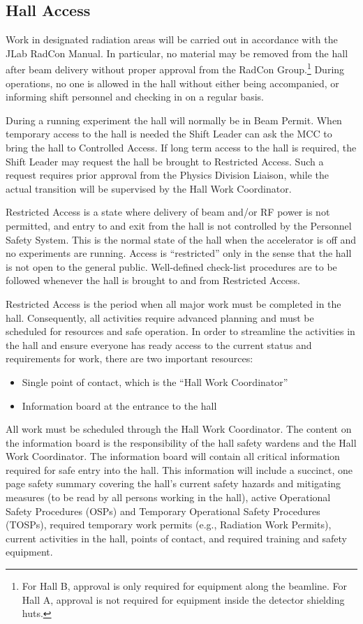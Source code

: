 \documentclass[10pt]{article}
\begin{document}
\subsection{Hall Access}

Work in designated radiation 
areas will be carried out in accordance
with the JLab RadCon Manual. In particular, no material 
may be removed from the hall after beam delivery
without proper approval from
the RadCon Group.\footnote{For Hall B, 
approval is only required for equipment along the beamline.
For Hall A, approval is not required for equipment inside the
detector shielding huts.} 
During operations, no one is allowed in the hall 
without either being accompanied, or informing shift personnel
and checking in on a regular basis. 
 
During a running experiment the hall will normally be in Beam Permit. When 
temporary access to the hall is needed the Shift Leader can ask the MCC to 
bring the hall to Controlled Access. If long term access to the hall is
required, the Shift Leader may request the hall be brought to Restricted
Access. Such a request requires prior approval from the Physics Division
Liaison, while the actual transition will be supervised by the Hall Work
Coordinator.

Restricted Access is a state where  delivery of beam and/or RF power is not 
permitted, and entry to and exit 
from the hall is not controlled by the Personnel Safety System. This is the 
normal state of the hall when the accelerator is off and no experiments are 
running. Access is ``restricted'' only in the sense that the hall is not open 
to the general public. Well-defined check-list procedures are to
be followed whenever the hall is brought to and from Restricted Access.

Restricted Access is the period when all major work must be completed in the
hall. Consequently, all activities require advanced planning and must be 
scheduled for resources and safe operation. In order to streamline the 
activities in the hall and ensure everyone
has ready access to the current status and requirements for work, there
are two important resources: 
\begin{itemize} 
\item Single point of contact, which is the ``Hall Work Coordinator''
\item Information board at the entrance to the hall
\end{itemize}
All work must be scheduled through the Hall Work Coordinator. The content 
on the information board is the responsibility of the hall safety wardens 
and the Hall Work Coordinator. The information board will contain all critical 
information required for safe entry into the hall. This information will
include a succinct, one page safety summary covering the hall's current
safety hazards and mitigating measures (to be read by all persons working
in the hall), active Operational Safety Procedures (OSPs) and Temporary
Operational Safety Procedures (TOSPs), required temporary work permits 
(e.g., Radiation Work Permits), current activities in the hall, points of 
contact, and required training and safety equipment.
\end{document}
